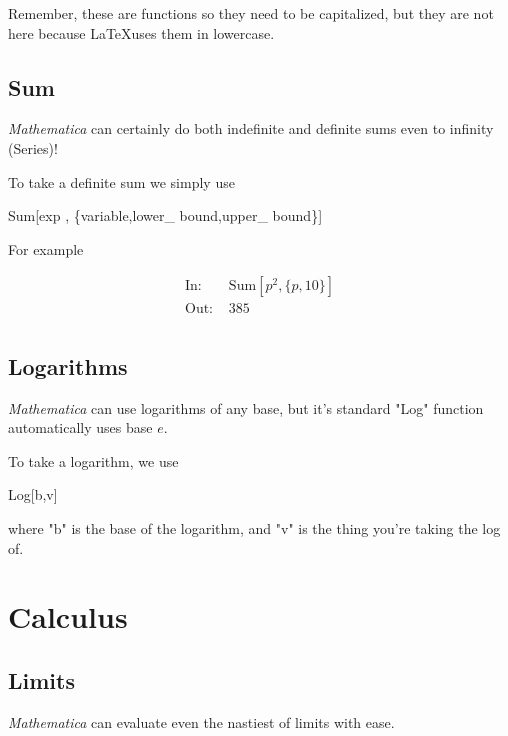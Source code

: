 \documentclass[11pt,letterpaper,twoside,titlepage]{report}
\newcommand{\Mathematica}{\textit{Mathematica} }
\begin{document}
				Remember, these are functions so they need to be capitalized, but they are not here because \LaTeX uses them in lowercase.
						
			\section{Sum}
						
				\Mathematica can certainly do both indefinite and definite sums even to infinity (Series)!
						
				To take a definite sum we simply use 

				\begin{center} Sum[exp , \{variable,lower\_ bound,upper\_ bound\}] \end{center}
						
					For example
						
					\begin{align*}
						\text{In: }& \text{Sum} [ p^2 , \{ p,10 \} ] \\
						\text{Out: }& 385 \\
					\end{align*}
					
			\section{Logarithms}
					
				\Mathematica can use logarithms of any base, but it's standard "Log" function automatically uses base $e$.
					
				To take a logarithm, we use
					
				\begin{center}
					
					Log[b,v]
					
				\end{center}
					
				where "b" is the base of the logarithm, and "v" is the thing you're taking the log of.
				
		\chapter{Calculus}
		
			\section{Limits}
			
				\Mathematica can evaluate even the nastiest of limits with ease. \\
				
\end{document}
